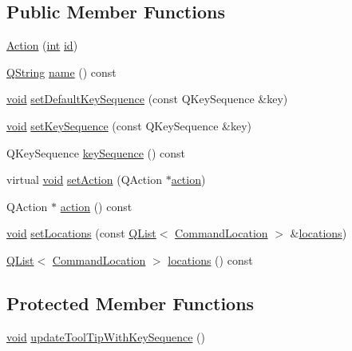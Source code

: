 \subsection*{Public Member Functions}
\begin{DoxyCompactItemize}
\item 
\hyperlink{group___core_plugin_ga1cf8a6592c0894b3ae9bf66cfe62f963}{Action} (\hyperlink{ioapi_8h_a787fa3cf048117ba7123753c1e74fcd6}{int} \hyperlink{glext_8h_a58c2a664503e14ffb8f21012aabff3e9}{id})
\item 
\hyperlink{group___u_a_v_objects_plugin_gab9d252f49c333c94a72f97ce3105a32d}{Q\-String} \hyperlink{group___core_plugin_ga93e449c5b7915f96cd811f0708f5c0ed}{name} () const 
\item 
\hyperlink{group___u_a_v_objects_plugin_ga444cf2ff3f0ecbe028adce838d373f5c}{void} \hyperlink{group___core_plugin_gaebb2eaae5b25ede83b091bca36053c49}{set\-Default\-Key\-Sequence} (const Q\-Key\-Sequence \&key)
\item 
\hyperlink{group___u_a_v_objects_plugin_ga444cf2ff3f0ecbe028adce838d373f5c}{void} \hyperlink{group___core_plugin_ga2f2036ff2277520d4e7c6371230449b8}{set\-Key\-Sequence} (const Q\-Key\-Sequence \&key)
\item 
Q\-Key\-Sequence \hyperlink{group___core_plugin_gac8fd65c5ff232ae1f16eab655bbb3612}{key\-Sequence} () const 
\item 
virtual \hyperlink{group___u_a_v_objects_plugin_ga444cf2ff3f0ecbe028adce838d373f5c}{void} \hyperlink{group___core_plugin_ga2650c3668e5d5c5678fa339e58e151cc}{set\-Action} (Q\-Action $\ast$\hyperlink{group___core_plugin_gaad3b2792dc4533f93c529fe55dcc26e8}{action})
\item 
Q\-Action $\ast$ \hyperlink{group___core_plugin_gaad3b2792dc4533f93c529fe55dcc26e8}{action} () const 
\item 
\hyperlink{group___u_a_v_objects_plugin_ga444cf2ff3f0ecbe028adce838d373f5c}{void} \hyperlink{group___core_plugin_ga17614acfea1ff2dea3d95a6dcb751589}{set\-Locations} (const \hyperlink{class_q_list}{Q\-List}$<$ \hyperlink{struct_command_location}{Command\-Location} $>$ \&\hyperlink{glext_8h_af3ad5b4e000c14e1b694dbb5a8eebb56}{locations})
\item 
\hyperlink{class_q_list}{Q\-List}$<$ \hyperlink{struct_command_location}{Command\-Location} $>$ \hyperlink{group___core_plugin_gad3e84fff2961dfdec8ee7d84e09ad61d}{locations} () const 
\end{DoxyCompactItemize}
\subsection*{Protected Member Functions}
\begin{DoxyCompactItemize}
\item 
\hyperlink{group___u_a_v_objects_plugin_ga444cf2ff3f0ecbe028adce838d373f5c}{void} \hyperlink{group___core_plugin_gaf1e48d2af090ec10cf6d278b8dd41b23}{update\-Tool\-Tip\-With\-Key\-Sequence} ()
\end{DoxyCompactItemize}
